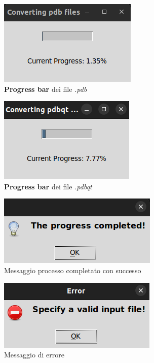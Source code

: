 \begin{figure}[H]
    \centering
    \includegraphics{immagini/pdbProgressBar.png}
    \caption{\textbf{Progress bar} dei file \textit{.pdb}}
    \label{fig:pdb progress bar}
\end{figure}

\begin{figure}[H]
    \centering
    \includegraphics{immagini/pdbqtProgressBar.png}
    \caption{\textbf{Progress bar} dei file \textit{.pdbqt}}
    \label{fig:pdbqt progress bar}
\end{figure}

\begin{figure}[H]
    \centering
    \includegraphics{immagini/progressCompletedLigands.png}
    \caption{Messaggio processo completato con successo}
    \label{fig:progress completed ligands}
\end{figure}

\begin{figure}[H]
    \centering
    \includegraphics{immagini/invalidInputLigands.png}
    \caption{Messaggio di errore}
    \label{fig:Invalid input ligands}
\end{figure}

